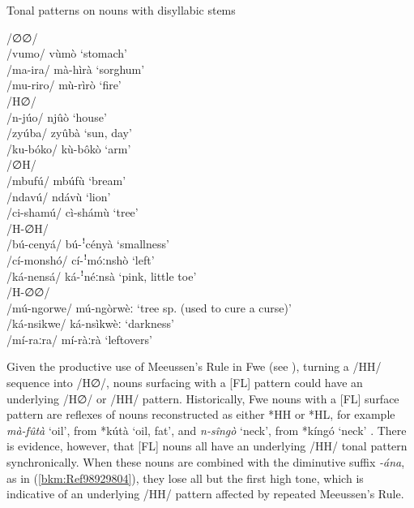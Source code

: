  \ea\label{ex:3:tonalpatterndisyllabic}
  Tonal patterns on nouns with disyllabic stems


%

\ea
/∅∅/ \tab [LL] \tab \\
/vumo/ \tab vùmò \tab ‘stomach’\\
/ma-ira/ \tab mà-hìrà \tab ‘sorghum’\\
/mu-riro/ \tab mù-rìrò \tab ‘fire’\\

\ex
/H∅/ \tab [FL] \tab \\
/n-júo/ \tab njûò \tab ‘house’\\
/zyúba/ \tab zyûbà \tab ‘sun, day’\\
/ku-bóko/ \tab kù-bôkò \tab ‘arm’\\

\ex
/∅H/ \tab [HL] \tab \\
/mbufú/ \tab mbúfù \tab ‘bream’\\
/ndavú/ \tab ndávù \tab ‘lion’\\
/ci-shamú/ \tab cì-shámù \tab ‘tree’\\

\newpage
\ex
/H-∅H/ \tab [H-ꜝHL ] \tab \\
/bú-cenyá/ \tab bú-ꜝcényà \tab ‘smallness’\\
/cí-monshó/ \tab cí-ꜝmóːnshò \tab ‘left’\\
/ká-nensá/ \tab ká-ꜝnéːnsà \tab ‘pink, little toe’\\

\ex
/H-∅∅/ \tab [H-LL ] \tab \\
/mú-ngorwe/ \tab mú-ngòrwèː \tab ‘tree sp. (used to \tab\tab\tab cure a curse)’\\
/ká-nsikwe/ \tab ká-nsìkwèː \tab ‘darkness’\\
/mí-raːra/ \tab mí-ràːrà \tab ‘leftovers’\label{bkm:Ref413224726}\\
\z
\z

Given the productive use of Meeussen’s Rule in Fwe (see ), turning a /HH/ se\-quence into /H∅/, nouns surfacing with a [FL] pattern could have an underlying /H∅/ or /HH/ pattern. Historically, Fwe nouns with a [FL] surface pattern are reflexes of nouns reconstructed as either *HH or *HL, for example \textit{mà-fûtà} ‘oil’, from *kútà ‘oil, fat’, and \textit{n-sîngò} ‘neck’, from *kíngó ‘neck’ \citep[121]{Bostoen2009}. There is evidence, however, that [FL] nouns all have an underlying /HH/ tonal pattern synchronically. When these nouns are combined with the diminutive suffix \textit{-ána}, as in (\ref{bkm:Ref98929804}), they lose all but the first high tone, which is indica\-tive of an underlying /HH/ pattern affected by repeated Meeussen’s Rule.

